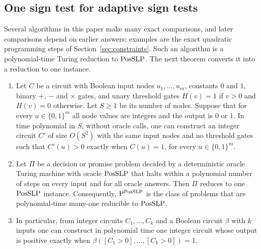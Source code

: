 \subsection{One sign test for adaptive sign tests}
\label{sec:upper-closure}

Several algorithms in this paper make many exact comparisons, and later
comparisons depend on earlier answers; examples are the exact quadratic
programming steps of Section~\ref{sec:constraints}. Such an algorithm is a
polynomial-time Turing reduction to $\mathrm{PosSLP}$. The next theorem converts it
into a reduction to one instance.

\begin{theorem}
\label{thm:posslp-closure}
\leavevmode
\begin{enumerate}[label=(\alph*)]
\item Let $C$ be a circuit with Boolean input nodes $u_1,\ldots,u_m$,
constants $0$ and $1$, binary $+$, $-$ and $\times$ gates, and unary threshold
gates $H(v)=1$ if $v>0$ and $H(v)=0$ otherwise. Let $S\ge1$ be its number of
nodes. Suppose that for every $u\in\{0,1\}^m$ all node values are integers
and the output is $0$ or $1$. In time polynomial in $S$, without oracle calls,
one can construct an integer circuit $C'$ of size $O(S^2)$ with the same
input nodes and no threshold gates such that $C'(u)>0$ exactly when
$C(u)=1$, for every $u\in\{0,1\}^m$.
\item Let $\Pi$ be a decision or promise problem decided by a deterministic
oracle Turing machine with oracle $\mathrm{PosSLP}$ that halts within a polynomial
number of steps on every input and for all oracle answers. Then $\Pi$
reduces to one $\mathrm{PosSLP}$ instance. Consequently, $\mathrm P^{\mathrm{PosSLP}}$ is the
class of problems that are polynomial-time many-one reducible to $\mathrm{PosSLP}$.
\item In particular, from integer circuits $C_1,\ldots,C_k$ and a Boolean
circuit $\beta$ with $k$ inputs one can construct in polynomial time one
integer circuit whose output is positive exactly when
$\beta([C_1>0],\ldots,[C_k>0])=1$.
\end{enumerate}
\end{theorem}

